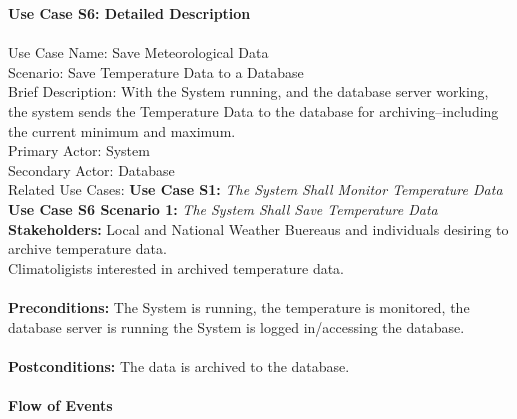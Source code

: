 \documentclass{article}
\begin{document}
\noindent
\textbf{Use Case S6:  Detailed Description}\\\\
Use Case Name:  Save Meteorological Data\\
Scenario:  Save Temperature Data to a Database\\
Brief Description:  With the System running, and the database server
working, the system sends the Temperature Data to the database for
archiving--including the current minimum and maximum.\\
Primary Actor:  System\\
Secondary Actor:  Database\\
Related Use Cases:  \textbf{Use Case S1:  }
\emph{The System Shall Monitor Temperature Data}\\
\textbf{Use Case S6 Scenario 1:  }
\emph{The System Shall Save Temperature Data}\\
\textbf{Stakeholders:  }Local and National Weather Buereaus and
individuals desiring to archive temperature data.\\Climatoligists
interested in archived temperature data.\\\\
\textbf{Preconditions:  }The System is running, the temperature is
monitored, the database server is running the System is logged
in/accessing the database.\\\\
\textbf{Postconditions:  }The data is archived to the database.\\\\
\textbf{Flow of Events}\\
\end{document}

